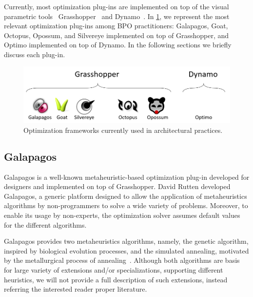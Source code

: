	Currently, most optimization plug-ins are implemented on top of the visual parametric tools~\cite{Cichocka2017SURVEY} Grasshopper~\cite{GRASSHOPPER} and Dynamo~\cite{DYNAMOBIM}. In \cref{fig:opt-plugins}, we represent the most relevant optimization plug-ins among \ac{BPO} practitioners: Galapagos, Goat, Octopus, Opossum, and Silvereye implemented on top of Grasshopper, and Optimo implemented on top of Dynamo. In the following sections we briefly discuss each plug-in.
	
\begin{figure}
\centering
\includegraphics[width=\textwidth]{Images/Background/opt-plugins.PNG}
\caption[Optimization Frameworks in the Architectural Practice]{Optimization frameworks currently used in architectural practices.}
\label{fig:opt-plugins}
\end{figure}

	
\subsection{Galapagos}

	Galapagos is a well-known metaheuristic-based optimization plug-in developed for designers and implemented on top of Grasshopper. David Rutten developed Galapagos, a generic platform designed to allow the application of metaheuristics algorithms by non-programmers to solve a wide variety of problems. Moreover, to enable its usage by non-experts, the optimization solver assumes default values for the different algorithms. 

	Galapagos provides two metaheuristics algorithms, namely, the genetic algorithm, inspired by biological evolution processes, and the simulated annealing, motivated by the metallurgical process of annealing~\cite{Brownlee2011}. Although both algorithms are basis for large variety of extensions and/or specializations, supporting different heuristics, we will not provide a full description of such extensions, instead referring the interested reader proper literature. 
	
